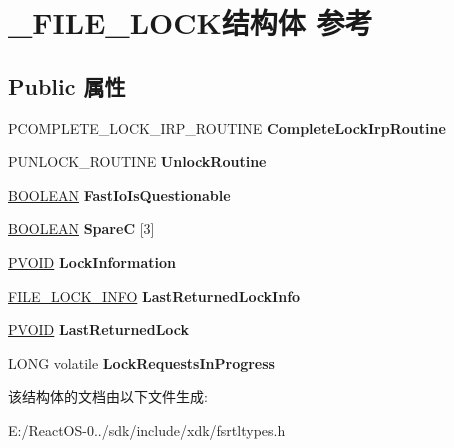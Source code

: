 \hypertarget{struct___f_i_l_e___l_o_c_k}{}\section{\+\_\+\+F\+I\+L\+E\+\_\+\+L\+O\+C\+K结构体 参考}
\label{struct___f_i_l_e___l_o_c_k}
\subsection*{Public 属性}
\begin{DoxyCompactItemize}
\item 
\mbox{\label{struct___f_i_l_e___l_o_c_k_abf2e76f25289affa50a7d40aaa67c754}} 
P\+C\+O\+M\+P\+L\+E\+T\+E\+\_\+\+L\+O\+C\+K\+\_\+\+I\+R\+P\+\_\+\+R\+O\+U\+T\+I\+NE {\bfseries Complete\+Lock\+Irp\+Routine}
\item 
\mbox{\label{struct___f_i_l_e___l_o_c_k_aba383a64131d909c4960124c714cac4f}} 
P\+U\+N\+L\+O\+C\+K\+\_\+\+R\+O\+U\+T\+I\+NE {\bfseries Unlock\+Routine}
\item 
\mbox{\label{struct___f_i_l_e___l_o_c_k_a4df1aa9f86f8e354dbb0063a29f39032}} 
\hyperlink{_processor_bind_8h_a112e3146cb38b6ee95e64d85842e380a}{B\+O\+O\+L\+E\+AN} {\bfseries Fast\+Io\+Is\+Questionable}
\item 
\mbox{\label{struct___f_i_l_e___l_o_c_k_a1bbb7177631194821016e629af5fe221}} 
\hyperlink{_processor_bind_8h_a112e3146cb38b6ee95e64d85842e380a}{B\+O\+O\+L\+E\+AN} {\bfseries SpareC} \mbox{[}3\mbox{]}
\item 
\mbox{\label{struct___f_i_l_e___l_o_c_k_a524f24747adabf655b96bcc2a7a26664}} 
\hyperlink{interfacevoid}{P\+V\+O\+ID} {\bfseries Lock\+Information}
\item 
\mbox{\label{struct___f_i_l_e___l_o_c_k_acfde05c5870823fee84de6d75c876882}} 
\hyperlink{struct___f_i_l_e___l_o_c_k___i_n_f_o}{F\+I\+L\+E\+\_\+\+L\+O\+C\+K\+\_\+\+I\+N\+FO} {\bfseries Last\+Returned\+Lock\+Info}
\item 
\mbox{\label{struct___f_i_l_e___l_o_c_k_a7f7c8e3265d8f79db6f4f0cfc84e63af}} 
\hyperlink{interfacevoid}{P\+V\+O\+ID} {\bfseries Last\+Returned\+Lock}
\item 
\mbox{\label{struct___f_i_l_e___l_o_c_k_a3749c51cf06e7611e489dd6490fbbf81}} 
L\+O\+NG volatile {\bfseries Lock\+Requests\+In\+Progress}
\end{DoxyCompactItemize}


该结构体的文档由以下文件生成\+:\begin{DoxyCompactItemize}
\item 
E\+:/\+React\+O\+S-\/0../sdk/include/xdk/fsrtltypes.\+h\end{DoxyCompactItemize}
